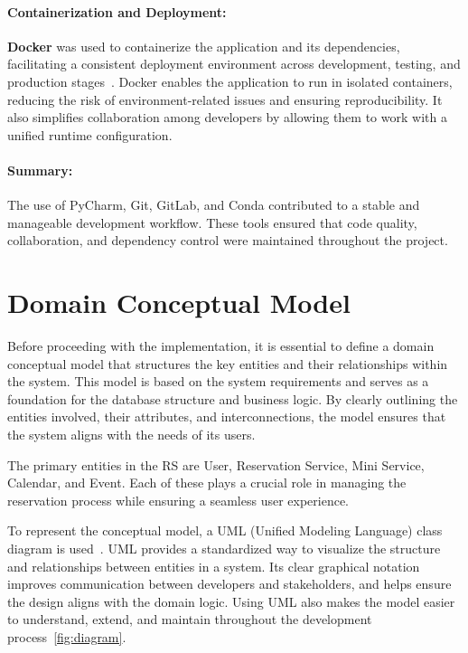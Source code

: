 \paragraph{Containerization and Deployment:}
\textbf{Docker} was used to containerize the application and its dependencies, facilitating a consistent deployment environment across development, testing, and production stages~\cite{docker}. Docker enables the application to run in isolated containers, reducing the risk of environment-related issues and ensuring reproducibility. It also simplifies collaboration among developers by allowing them to work with a unified runtime configuration.

\paragraph{Summary:}
The use of PyCharm, Git, GitLab, and Conda contributed to a stable and manageable development workflow. These tools ensured that code quality, collaboration, and dependency control were maintained throughout the project.

\section{Domain Conceptual Model}

Before proceeding with the implementation, it is essential to define a domain conceptual model that structures the key entities and their relationships within the system. This model is based on the system requirements and serves as a foundation for the database structure and business logic. By clearly outlining the entities involved, their attributes, and interconnections, the model ensures that the system aligns with the needs of its users.

The primary entities in the RS are User, Reservation Service, Mini Service, Calendar, and Event. Each of these plays a crucial role in managing the reservation process while ensuring a seamless user experience.

To represent the conceptual model, a UML (Unified Modeling Language) class diagram is used~\cite{UMLdiagram}. UML provides a standardized way to visualize the structure and relationships between entities in a system. Its clear graphical notation improves communication between developers and stakeholders, and helps ensure the design aligns with the domain logic. Using UML also makes the model easier to understand, extend, and maintain throughout the development process~\ref{fig:diagram}.

